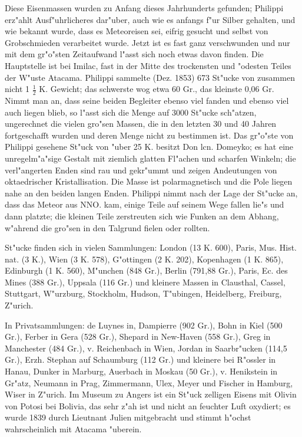 \documentclass[a4paper, 11pt, oneside]{article}
\begin{document}
Diese Eisenmassen wurden zu Anfang dieses Jahrhunderts gefunden; Philippi erz"ahlt Ausf"uhrlicheres dar"uber, auch wie es anfangs f"ur Silber gehalten, und wie bekannt wurde, dass es Meteoreisen sei, eifrig gesucht und selbst von Grobschmieden verarbeitet wurde. Jetzt ist es fast ganz verschwunden und nur mit dem gr"o"sten Zeitaufwand l"asst sich noch etwas davon finden. Die Hauptstelle ist bei Imilac, fast in der Mitte des trockensten und "odesten Teiles der W"uste Atacama. Philippi sammelte (Dez. 1853) 673 St"ucke von zusammen nicht 1 $\frac{1}{2}$ K. Gewicht; das schwerste wog etwa 60 Gr., das kleinste 0,06 Gr. Nimmt man an, dass seine beiden Begleiter ebenso viel fanden und ebenso viel auch liegen blieb, so l"asst sich die Menge auf 3000 St"ucke sch"atzen, ungerechnet die vielen gro"sen Massen, die in den letzten 30 und 40 Jahren fortgeschafft wurden und deren Menge nicht zu bestimmen ist. Das gr"o"ste von Philippi gesehene St"uck von "uber 25 K. besitzt Don lcn. Domeyko; es hat eine unregelm"a"sige Gestalt mit ziemlich glatten Fl"achen und scharfen Winkeln; die verl"angerten Enden sind rau und gekr"ummt und zeigen Andeutungen von oktaedrischer Kristallisation. Die Masse ist polarmagnetisch und die Pole liegen nahe an den beiden langen Enden. Philippi nimmt nach der Lage der St"ucke an, dass das Meteor aus NNO. kam, einige Teile auf seinem Wege fallen lie"s und dann platzte; die kleinen Teile zerstreuten sich wie Funken an dem Abhang, w"ahrend die gro"sen in den Talgrund fielen oder rollten.

St"ucke finden sich in vielen Sammlungen: London (13 K. 600), Paris, Mus. Hist. nat. (3 K.), Wien (3 K. 578), G"ottingen (2 K. 202), Kopenhagen (1 K. 865), Edinburgh (1 K. 560), M"unchen (848 Gr.), Berlin (791,88 Gr.), Paris, Ec. des Mines (388 Gr.), Uppsala (116 Gr.) und kleinere Massen in Clausthal, Cassel, Stuttgart, W"urzburg, Stockholm, Hudson, T"ubingen, Heidelberg, Freiburg, Z"urich.

In Privatsammlungen: de Luynes in, Dampierre (902 Gr.), Bohn in Kiel (500 Gr.), Ferber in Gera (528 Gr.), Shepard in New-Haven (558 Gr.), Greg in Manchester (484 Gr.), v. Reichenbach in Wien, Jordan in Saarbr"ucken (114,5 Gr.), Erzh. Stephan auf Schaumburg (112 Gr.) und kleinere bei R"ossler in Hanau, Dunker in Marburg, Auerbach in Moskau (50 Gr.), v. Henikstein in Gr"atz, Neumann in Prag, Zimmermann, Ulex, Meyer und Fischer in Hamburg, Wiser in Z"urich. Im Museum zu Angers ist ein St"uck zelligen Eisens mit Olivin von Potosi bei Bolivia, das sehr z"ah ist und nicht an feuchter Luft oxydiert; es wurde 1839 durch Lieutnant Julien mitgebracht und stimmt h"ochst wahrscheinlich mit Atacama "uberein.
\end{document}
